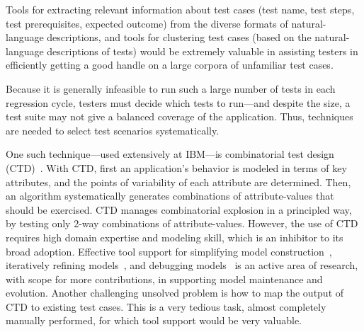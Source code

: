 Tools for extracting relevant information about test cases (\eg test name, test
steps, test prerequisites, expected outcome) from the diverse formats of
natural-language descriptions, and tools for clustering test cases (based on the
natural-language descriptions of tests) would be extremely valuable in assisting
testers in efficiently getting a good handle on a large corpora of unfamiliar
test cases. 

Because it is generally infeasible to run such a large number of tests in each
regression cycle, testers must decide which tests to run---and despite the size,
a test suite may not give a balanced coverage of the application.  Thus,
techniques are needed to select test scenarios systematically.

One such technique---used extensively at IBM---is combinatorial test design
(CTD)~\cite{Cohen:1996, Cohen:1997, Cohen:2003}.  With CTD, first an
application's behavior is modeled in terms of key attributes, and the points of
variability of each attribute are determined. Then, an algorithm systematically
generates combinations of attribute-values that should be exercised.  CTD
manages combinatorial explosion in a principled way, \eg by testing only 
2-way combinations of attribute-values.  However, the use of CTD requires high
domain expertise and modeling skill, which is an inhibitor to its broad
adoption.  Effective tool support for simplifying model
construction~\cite{Segall:2012a}, iteratively refining
models~\cite{Segall:2012b}, and debugging models~\cite{Farchi:2013} is an active
area of research, with scope for more contributions, \eg in supporting model
maintenance and evolution.
Another challenging unsolved problem is how to map the output of CTD 
to existing test cases. This is a very tedious task, almost completely manually
performed, for which tool support would be very valuable.




